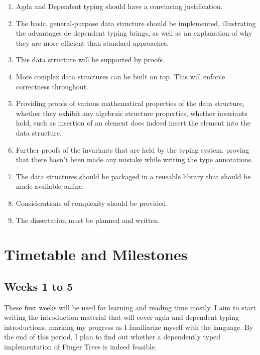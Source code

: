 \documentclass[12pt]{article}
\begin{document}
\begin{enumerate}

\item Agda and Dependent typing should have a convincing justification.

\item The basic, general-purpose data structure should be implemented, illustrating
the advantages de dependent typing brings, as well as an explanation of why they
are more efficient than standard approaches.

\item This data structure will be supported by proofs.

\item More complex data structures can be built on top. This will enforce
correctness throughout.

\item Providing proofs of various mathematical properties of the data structure,
whether they exhibit any algebraic structure properties, whether invariants hold,
such as insertion of an element does indeed insert the element into the data structure.

\item Further proofs of the invariants that are held by the typing system, proving
that there hasn't been made any mistake while writing the type annotations.

\item The data structures should be packaged in a reusable library that should be
made available online.

\item Considerations of complexity should be provided.

\item The dissertation must be planned and written.

\end{enumerate}

\section*{Timetable and Milestones}

\subsection*{Weeks 1 to 5}

These first weeks will be used for learning and reading time mostly. I aim to
start writing the introduction material that will cover agda and dependent typing
introductions, marking my progress as I familiarize myself with the language.
By the end of this period, I plan to find out whether a dependently typed implementation
of Finger Trees is indeed feasible.
\end{document}

